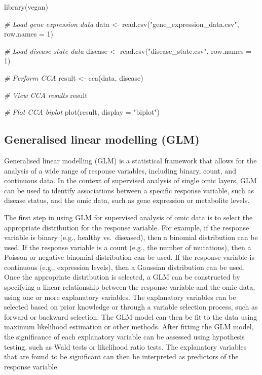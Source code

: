 \documentclass[
]{book}
\newenvironment{Shaded}{\begin{snugshade}}{\end{snugshade}}
\newcommand{\AttributeTok}[1]{\textcolor[rgb]{0.77,0.63,0.00}{#1}}
\newcommand{\CommentTok}[1]{\textcolor[rgb]{0.56,0.35,0.01}{\textit{#1}}}
\newcommand{\DecValTok}[1]{\textcolor[rgb]{0.00,0.00,0.81}{#1}}
\newcommand{\FunctionTok}[1]{\textcolor[rgb]{0.00,0.00,0.00}{#1}}
\newcommand{\NormalTok}[1]{#1}
\newcommand{\OtherTok}[1]{\textcolor[rgb]{0.56,0.35,0.01}{#1}}
\newcommand{\StringTok}[1]{\textcolor[rgb]{0.31,0.60,0.02}{#1}}
\begin{document}
\begin{Shaded}
\begin{Highlighting}[]
\FunctionTok{library}\NormalTok{(vegan)}

\CommentTok{\# Load gene expression data}
\NormalTok{data }\OtherTok{\textless{}{-}} \FunctionTok{read.csv}\NormalTok{(}\StringTok{"gene\_expression\_data.csv"}\NormalTok{, }\AttributeTok{row.names =} \DecValTok{1}\NormalTok{)}

\CommentTok{\# Load disease state data}
\NormalTok{disease }\OtherTok{\textless{}{-}} \FunctionTok{read.csv}\NormalTok{(}\StringTok{"disease\_state.csv"}\NormalTok{, }\AttributeTok{row.names =} \DecValTok{1}\NormalTok{)}

\CommentTok{\# Perform CCA}
\NormalTok{result }\OtherTok{\textless{}{-}} \FunctionTok{cca}\NormalTok{(data, disease)}

\CommentTok{\# View CCA results}
\NormalTok{result}

\CommentTok{\# Plot CCA biplot}
\FunctionTok{plot}\NormalTok{(result, }\AttributeTok{display =} \StringTok{"biplot"}\NormalTok{)}
\end{Highlighting}
\end{Shaded}

\normalsize

\hypertarget{generalised-linear-modelling}{%
\subsection{Generalised linear modelling (GLM)}\label{generalised-linear-modelling}}

Generalised linear modelling (GLM) is a statistical framework that allows for the analysis of a wide range of response variables, including binary, count, and continuous data. In the context of supervised analysis of single omic layers, GLM can be used to identify associations between a specific response variable, such as disease status, and the omic data, such as gene expression or metabolite levels.

The first step in using GLM for supervised analysis of omic data is to select the appropriate distribution for the response variable. For example, if the response variable is binary (e.g., healthy vs.~diseased), then a binomial distribution can be used. If the response variable is a count (e.g., the number of mutations), then a Poisson or negative binomial distribution can be used. If the response variable is continuous (e.g., expression levels), then a Gaussian distribution can be used. Once the appropriate distribution is selected, a GLM can be constructed by specifying a linear relationship between the response variable and the omic data, using one or more explanatory variables. The explanatory variables can be selected based on prior knowledge or through a variable selection process, such as forward or backward selection. The GLM model can then be fit to the data using maximum likelihood estimation or other methods. After fitting the GLM model, the significance of each explanatory variable can be assessed using hypothesis testing, such as Wald tests or likelihood ratio tests. The explanatory variables that are found to be significant can then be interpreted as predictors of the response variable.
\end{document}
